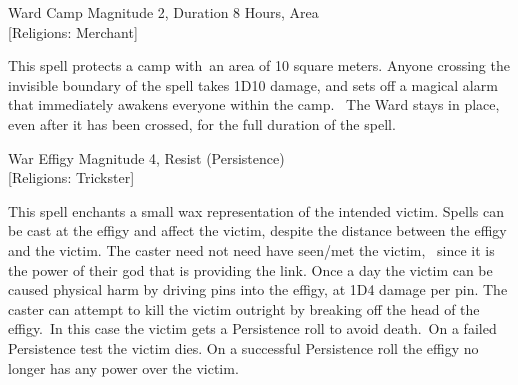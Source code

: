 \begin{rpg-spell}
{Ward Camp}
{Magnitude 2, Duration 8 Hours, Area\\{[Religions: Merchant]}}

This spell protects a camp with an area of 10 square meters. Anyone crossing the invisible boundary of the spell takes 1D10 damage, and sets off a magical alarm that immediately awakens everyone within the camp.  The Ward stays in place, even after it has been crossed, for the full duration of the spell.
\end{rpg-spell}

\begin{rpg-spell}
{War Effigy}
{Magnitude 4, Resist (Persistence)\\{[Religions: Trickster]}}

This spell enchants a small wax representation of the intended victim. Spells can be cast at the effigy and affect the victim, despite the distance between the effigy and the victim. The caster need not need have seen/met the victim,  since it is the power of their god that is providing the link. Once a day the victim can be caused physical harm by driving pins into the effigy, at 1D4 damage per pin. The caster can attempt to kill the victim outright by breaking off the head of the effigy. In this case the victim gets a Persistence roll to avoid death. On a failed Persistence test the victim dies. On a successful Persistence roll the effigy no longer has any power over the victim.
\end{rpg-spell}

